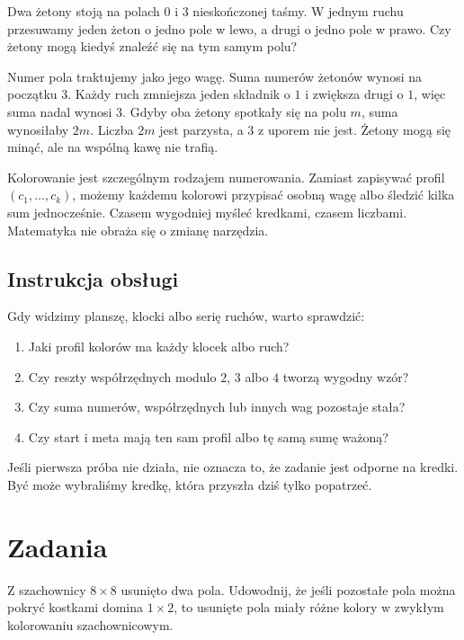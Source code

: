 \documentclass{lecture-kuznia}
\begin{document}
\begin{example}\label{Ezaby}
	Dwa żetony stoją na polach $0$ i $3$ nieskończonej taśmy. W jednym ruchu
	przesuwamy jeden żeton o jedno pole w lewo, a drugi o jedno pole w prawo.
	Czy żetony mogą kiedyś znaleźć się na tym samym polu?
\end{example}

\begin{solution*}[\ref{Ezaby}]
	Numer pola traktujemy jako jego wagę. Suma numerów żetonów wynosi na
	początku $3$. Każdy ruch zmniejsza jeden składnik o $1$ i zwiększa drugi
	o $1$, więc suma nadal wynosi $3$. Gdyby oba żetony spotkały się na polu
	$m$, suma wynosiłaby $2m$. Liczba $2m$ jest parzysta, a $3$ z uporem nie
	jest. Żetony mogą się minąć, ale na wspólną kawę nie trafią.
\end{solution*}

Kolorowanie jest szczególnym rodzajem numerowania. Zamiast zapisywać profil
$(c_1,\dots,c_k)$, możemy każdemu kolorowi przypisać osobną wagę albo
śledzić kilka sum jednocześnie. Czasem wygodniej myśleć kredkami, czasem
liczbami. Matematyka nie obraża się o zmianę narzędzia.

\subsection{Instrukcja obsługi}

Gdy widzimy planszę, klocki albo serię ruchów, warto sprawdzić:

\begin{enumerate}[itemsep=0pt,topsep=4pt]
	\item Jaki profil kolorów ma każdy klocek albo ruch?
	\item Czy reszty współrzędnych modulo $2$, $3$ albo $4$ tworzą wygodny wzór?
	\item Czy suma numerów, współrzędnych lub innych wag pozostaje stała?
	\item Czy start i meta mają ten sam profil albo tę samą sumę ważoną?
\end{enumerate}

Jeśli pierwsza próba nie działa, nie oznacza to, że zadanie jest odporne na
kredki. Być może wybraliśmy kredkę, która przyszła dziś tylko popatrzeć.

\newpage
\section{Zadania}

\begin{problem}[Rozgrzewka]\label{Z1}
	Z szachownicy $8\times8$ usunięto dwa pola. Udowodnij, że jeśli pozostałe
	pola można pokryć kostkami domina $1\times2$, to usunięte pola miały różne
	kolory w zwykłym kolorowaniu szachownicowym.
\end{problem}
\end{document}

